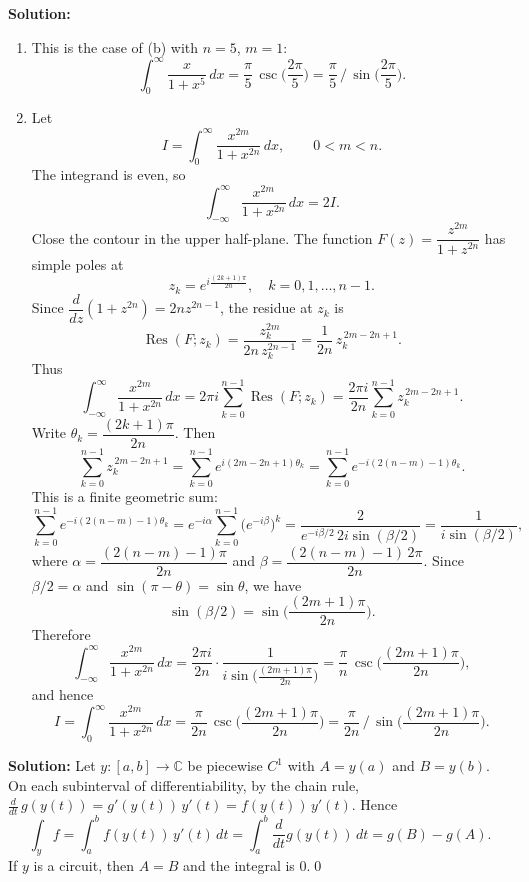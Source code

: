 \bigskip\noindent\textbf{Solution:}
\begin{enumerate}[label=(\alph*)]
\item This is the case of (b) with $n=5$, $m=1$:
\[\int_0^{\infty}\frac{x}{1+x^5}\,dx=\frac{\pi}{5}\,\csc\!\Big(\frac{2\pi}{5}\Big)=\frac{\pi}{5}\,\Big/\,\sin\!\Big(\frac{2\pi}{5}\Big).\]

\item Let
\[I=\int_0^{\infty}\frac{x^{2m}}{1+x^{2n}}\,dx,\qquad 0<m<n.\]
The integrand is even, so
\[\int_{-\infty}^{\infty}\frac{x^{2m}}{1+x^{2n}}\,dx=2I.\]
Close the contour in the upper half-plane. The function $F(z)=\dfrac{z^{2m}}{1+z^{2n}}$ has simple poles at
\[z_k=e^{i\frac{(2k+1)\pi}{2n}},\quad k=0,1,\dots,n-1.\]
Since $\dfrac{d}{dz}(1+z^{2n})=2n z^{2n-1}$, the residue at $z_k$ is
\[\operatorname{Res}(F;z_k)=\frac{z_k^{2m}}{2n\,z_k^{2n-1}}=\frac{1}{2n}\,z_k^{\,2m-2n+1}.\]
Thus
\[\int_{-\infty}^{\infty}\frac{x^{2m}}{1+x^{2n}}\,dx=2\pi i\sum_{k=0}^{n-1}\operatorname{Res}(F;z_k)=\frac{2\pi i}{2n}\sum_{k=0}^{n-1} z_k^{\,2m-2n+1}.\]
Write $\theta_k=\dfrac{(2k+1)\pi}{2n}$. Then
\[\sum_{k=0}^{n-1} z_k^{\,2m-2n+1}=\sum_{k=0}^{n-1} e^{i(2m-2n+1)\theta_k}=\sum_{k=0}^{n-1} e^{-i(2(n-m)-1)\theta_k}.
\]
This is a finite geometric sum:
\[\sum_{k=0}^{n-1} e^{-i(2(n-m)-1)\theta_k}=e^{-i\alpha}\sum_{k=0}^{n-1} \Big(e^{-i\beta}\Big)^k=\frac{2}{e^{-i\beta/2}\,2i\sin(\beta/2)}=\frac{1}{i\sin(\beta/2)},\]
where $\alpha=\dfrac{(2(n-m)-1)\pi}{2n}$ and $\beta=\dfrac{(2(n-m)-1)\,2\pi}{2n}$. Since $\beta/2=\alpha$ and $\sin(\pi-\theta)=\sin\theta$, we have
\[\sin(\beta/2)=\sin\!\Big(\frac{(2m+1)\pi}{2n}\Big).\]
Therefore
\[\int_{-\infty}^{\infty}\frac{x^{2m}}{1+x^{2n}}\,dx=\frac{2\pi i}{2n}\cdot\frac{1}{i\sin\!\big(\frac{(2m+1)\pi}{2n}\big)}=\frac{\pi}{n}\,\csc\!\Big(\frac{(2m+1)\pi}{2n}\Big),\]
and hence
\[I=\int_0^{\infty}\frac{x^{2m}}{1+x^{2n}}\,dx=\frac{\pi}{2n}\,\csc\!\Big(\frac{(2m+1)\pi}{2n}\Big)=\frac{\pi}{2n}\,\Big/\,\sin\!\Big(\frac{(2m+1)\pi}{2n}\Big).\]
\end{enumerate}

\bigskip\noindent\textbf{Solution:}
Let $y:[a,b]\to\mathbb C$ be piecewise $C^1$ with $A=y(a)$ and $B=y(b)$. On each subinterval of differentiability, by the chain rule, $\frac{d}{dt}\,g(y(t))=g'(y(t))\,y'(t)=f(y(t))\,y'(t)$. Hence
\[\int_y f=\int_a^b f(y(t))\,y'(t)\,dt=\int_a^b \frac{d}{dt}g(y(t))\,dt=g(B)-g(A).\]
If $y$ is a circuit, then $A=B$ and the integral is $0$.\qed


